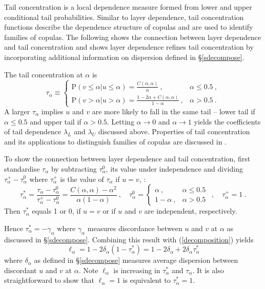 \documentclass[authoryear]{elsarticle}
\newcommand{\p}{\mathrm{P}}
\newcommand{\cq}{\ ,\quad }
\newcommand{\eref}[1]{(\ref{#1})}
\newcommand{\sref}[1]{\S\ref{#1}}
\begin{document}
Tail concentration \citep{venter2002tails} is a local dependence measure formed from lower and upper conditional tail probabilities. Similar to layer dependence, tail concentration functions describe the dependence structure of copulas and are used to identify families of copulas. The following shows the connection between layer dependence and tail concentration and shows layer dependence refines tail concentration by incorporating additional information on dispersion defined in \sref{sdecompose}.

The tail concentration at $\alpha$ is
$$
\tau_\alpha  \equiv \left\{\begin{array}{lr}\p(v\leq \alpha|u\leq \alpha)=\frac{C(\alpha,\alpha)}{\alpha}\ ,  & \alpha\leq 0.5\ , \\
\p(v>\alpha|u>\alpha)=\frac{1-2\alpha+C(\alpha,\alpha)}{1-\alpha}\ ,& \alpha>0.5\ .\end{array}\right.
$$
A larger $\tau_\alpha$ implies $u$ and $v$ are more likely to fall in the same tail -- lower tail if $\alpha\leq 0.5$ and upper tail if $\alpha>0.5$. Letting $\alpha\rightarrow 0$ and $\alpha\rightarrow 1$  yields the coefficients of tail dependence $\lambda_L$ and $\lambda_U$ discussed above. Properties of tail concentration and its applications to distinguish families of copulas are  discussed in \cite{durante2014copulas}.


To show the connection between layer dependence and tail concentration, first standardise $\tau_\alpha$ by subtracting $\tau_\alpha^0$, its value under independence and dividing $\tau_\alpha^+-\tau_\alpha^0$ where $\tau_\alpha^+$ is the value of $\tau_\alpha$ if $u=v$, :
$$
\tau_\alpha^*=\frac{\tau_\alpha-\tau_\alpha^0}{\tau_\alpha^+-\tau_\alpha^0} = \frac{C(\alpha,\alpha)-\alpha^2}{\alpha(1-\alpha)}
\cq
\tau_\alpha^0=\left\{\begin{array}{cc}\alpha \ , & \alpha\leq 0.5\ \\
1-\alpha \ ,& \alpha>0.5 \ \end{array}\right.
\cq
\tau_\alpha^+=1 \;.
$$
Then $\tau_\alpha^*$ equals 1 or 0, if $u=v$ or  if $u$ and $v$ are independent, respectively.

Hence $\tau_\alpha^*=-\gamma_\alpha$ where $\gamma_\alpha$ measures discordance between $u$ and $v$ at $\alpha$ as discussed in \sref{sdecompose}. Combining this result with \eref{decomposition} yields
$$
\ell_\alpha=1-2\delta_\alpha(1-\tau_\alpha^*) = 1-2\delta_\alpha + 2\delta_\alpha \tau_\alpha^*
$$
where $\delta_\alpha$ as defined in \sref{sdecompose} measures average dispersion between discordant $u$ and $v$ at $\alpha$.  Note $\ell_\alpha$ is increasing in $\tau_\alpha^*$ and $\tau_\alpha$. It is also straightforward to show that $\ell_\alpha=1$ is equivalent to $\tau_\alpha^*=1$.
\end{document}
